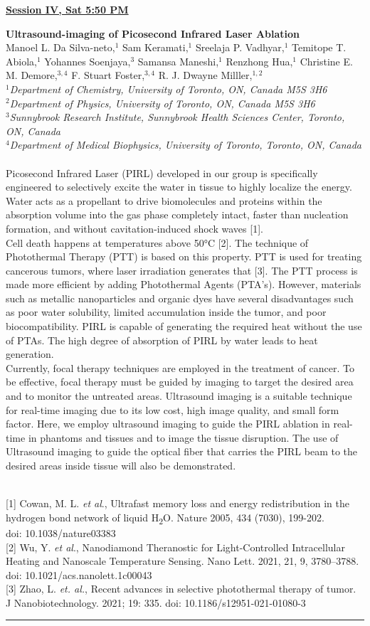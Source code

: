 \documentclass[titlepage,oneside,openany,10pt]{book}
\newenvironment{oralabswref}[5] %
        {
        \newcommand{\oralref}{#5}
        \begin{flushright}
                \underline{\textbf{#4}}
        \end{flushright}
        \textbf{#1}\\%
        #2\\%
        \textit{#3}\\\\%
        }
        {
        \vspace{0.5cm}
        \\\noindent \oralref \\ \noindent\rule{15cm}{0.5pt}%
        }
\begin{document}
\newpage

\begin{oralabswref}
	{Ultrasound-imaging of Picosecond Infrared Laser Ablation}
	{Manoel L. Da Silva-neto,$^{1}$ Sam Keramati,$^{1}$ Sreelaja P. Vadhyar,$^{1}$ Temitope T. Abiola,$^{1}$ Yohannes Soenjaya,$^{3}$ Samansa Maneshi,$^{1}$ Renzhong Hua,$^{1}$ Christine E. M. Demore,$^{3,4}$ F. Stuart Foster,$^{3,4}$ R. J. Dwayne Milller,$^{1,2}$}
	{
	$^1$Department of Chemistry, University of Toronto, ON, Canada M5S 3H6\\
	$^2$Department of Physics, University of Toronto, ON, Canada M5S 3H6\\
	$^3$Sunnybrook Research Institute, Sunnybrook Health Sciences Center, Toronto, ON, Canada\\
	$^4$Department of Medical Biophysics, University of Toronto, Toronto, ON, Canada
	}
	{Session IV, Sat 5:50 PM}
	{
	{[1]} Cowan, M. L. \emph{et al}., Ultrafast memory loss and energy redistribution in the hydrogen bond network of liquid H\textsubscript{2}O. Nature 2005, 434 (7030), 199-202.\\doi: 10.1038/nature03383\\
	{[2]} Wu, Y. \emph{et al}., Nanodiamond Theranostic for Light-Controlled Intracellular Heating and Nanoscale Temperature Sensing. Nano Lett. 2021, 21, 9, 3780--3788. doi: 10.1021/acs.nanolett.1c00043\\
	{[3]} Zhao, L. \emph{et. al.}, Recent advances in selective photothermal therapy of tumor. J Nanobiotechnology. 2021; 19: 335. doi: 10.1186/s12951-021-01080-3
	}
	Picosecond Infrared Laser (PIRL) developed in our group is specifically engineered to selectively excite the water in tissue to highly localize the energy. Water acts as a propellant to drive biomolecules and proteins within the absorption volume into the gas phase completely intact, faster than nucleation formation, and without cavitation-induced shock waves {[}1{]}.\\Cell death happens at temperatures above 50°C {[}2{]}. The technique of Photothermal Therapy (PTT) is based on this property. PTT is used for treating cancerous tumors, where laser irradiation generates that {[}3{]}. The PTT process is made more efficient by adding Photothermal Agents (PTA's). However, materials such as metallic nanoparticles and organic dyes have several disadvantages such as poor water solubility, limited accumulation inside the tumor, and poor biocompatibility. PIRL is capable of generating the required heat without the use of PTAs. The high degree of absorption of PIRL by water leads to heat generation.\\Currently, focal therapy techniques are employed in the treatment of cancer. To be effective, focal therapy must be guided by imaging to target the desired area and to monitor the untreated areas. Ultrasound imaging is a suitable technique for real-time imaging due to its low cost, high image quality, and small form factor. Here, we employ ultrasound imaging to guide the PIRL ablation in real-time in phantoms and tissues and to image the tissue disruption. The use of Ultrasound imaging to guide the optical fiber that carries the PIRL beam to the desired areas inside tissue will also be demonstrated.
	\label{Da silva netoM}
\end{oralabswref}
\end{document}
